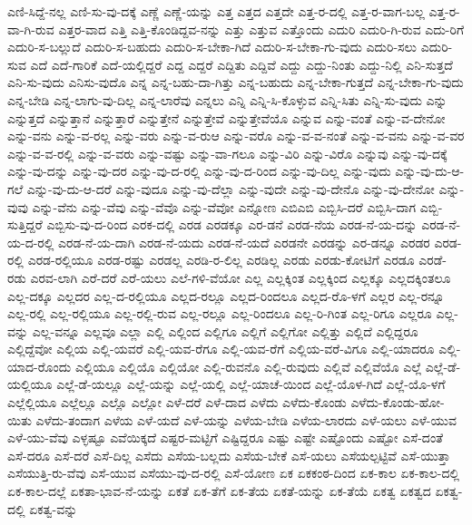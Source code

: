 {ಎಣಿ-ಸಿದ್ದೆ-ನಲ್ಲ
ಎಣಿ-ಸು-ವು-ದಕ್ಕೆ
ಎಣ್ಣೆ
ಎಣ್ಣೆ-ಯನ್ನು
ಎತ್ತ
ಎತ್ತದ
ಎತ್ತದೇ
ಎತ್ತ-ರ-ದಲ್ಲಿ
ಎತ್ತ-ರ-ವಾಗ-ಬಲ್ಲ
ಎತ್ತ-ರ-ವಾ-ಗಿ-ರುವ
ಎತ್ತರ-ವಾದ
ಎತ್ತಿ
ಎತ್ತಿ-ಕೊಂಡಿದ್ದವ-ನನ್ನು
ಎತ್ತು
ಎತ್ತುವ
ಎತ್ತೊಂದು
ಎದುರಿ
ಎದುರಿ-ಗಿ-ರುವ
ಎದು-ರಿಗೆ
ಎದುರಿ-ಸ-ಬಲ್ಲುದೆ
ಎದುರಿ-ಸ-ಬಹುದು
ಎದುರಿ-ಸ-ಬೇಕಾ-ಗಿದೆ
ಎದುರಿ-ಸ-ಬೇಕಾ-ಗು-ವುದು
ಎದುರಿ-ಸಲು
ಎದುರಿ-ಸುವ
ಎದೆ
ಎದೆ-ಗಾರಿಕೆ
ಎದೆ-ಯಲ್ಲಿದ್ದರೆ
ಎದ್ದ
ಎದ್ದರೆ
ಎದ್ದಿತು
ಎದ್ದಿವೆ
ಎದ್ದು
ಎದ್ದು-ನಿಂತು
ಎದ್ದು-ನಿಲ್ಲಿ
ಎನಿ-ಸುತ್ತದೆ
ಎನಿ-ಸು-ವುದು
ಎನಿಸು-ವುದೊ
ಎನ್ನ
ಎನ್ನ-ಬಹು-ದಾ-ಗಿತ್ತು
ಎನ್ನ-ಬಹುದು
ಎನ್ನ-ಬೇಕಾ-ಗುತ್ತದೆ
ಎನ್ನ-ಬೇಕಾ-ಗು-ವುದು
ಎನ್ನ-ಬೇಡಿ
ಎನ್ನ-ಲಾಗು-ವು-ದಿಲ್ಲ
ಎನ್ನ-ಲಾರೆವು
ಎನ್ನಲು
ಎನ್ನಿ
ಎನ್ನಿ-ಸಿ-ಕೊಳ್ಳುವ
ಎನ್ನಿ-ಸಿತು
ಎನ್ನಿ-ಸು-ವುದು
ಎನ್ನು
ಎನ್ನುತ್ತದೆ
ಎನ್ನುತ್ತಾನೆ
ಎನ್ನುತ್ತಾರೆ
ಎನ್ನುತ್ತೇನೆ
ಎನ್ನುತ್ತೇವೆ
ಎನ್ನುತ್ತೇವೆಯೊ
ಎನ್ನುವ
ಎನ್ನು-ವಂತೆ
ಎನ್ನು-ವ-ದೇನೋ
ಎನ್ನು-ವನು
ಎನ್ನು-ವ-ರಲ್ಲ
ಎನ್ನು-ವರು
ಎನ್ನು-ವ-ರುಆ
ಎನ್ನು-ವರೊ
ಎನ್ನು-ವ-ವ-ನಂತೆ
ಎನ್ನು-ವ-ವನು
ಎನ್ನು-ವ-ವರ
ಎನ್ನು-ವ-ವ-ರಲ್ಲಿ
ಎನ್ನು-ವ-ವರು
ಎನ್ನು-ವಷ್ಟು
ಎನ್ನು-ವಾ-ಗಲೂ
ಎನ್ನು-ವಿರಿ
ಎನ್ನು-ವಿರೊ
ಎನ್ನುವು
ಎನ್ನು-ವು-ದಕ್ಕೆ
ಎನ್ನು-ವು-ದನ್ನು
ಎನ್ನು-ವು-ದರ
ಎನ್ನು-ವು-ದ-ರಲ್ಲಿ
ಎನ್ನು-ವು-ದ-ರಿಂದ
ಎನ್ನು-ವು-ದಿಲ್ಲ
ಎನ್ನು-ವುದು
ಎನ್ನು-ವು-ದು-ಆ-ಗಲೆ
ಎನ್ನು-ವು-ದು-ಆ-ದರೆ
ಎನ್ನು-ವುದೂ
ಎನ್ನು-ವು-ದೆಲ್ಲಾ
ಎನ್ನು-ವುದೇ
ಎನ್ನು-ವು-ದೇನೊ
ಎನ್ನು-ವು-ದೇನೋ
ಎನ್ನು-ವುವು
ಎನ್ನು-ವೆನು
ಎನ್ನು-ವೆವು
ಎನ್ನು-ವೆವೊ
ಎನ್ನು-ವೆವೋ
ಎನ್ನೋಣ
ಎಬಿಎಬಿ
ಎಬ್ಬಿಸಿ-ದರೆ
ಎಬ್ಬಿಸಿ-ದಾಗ
ಎಬ್ಬಿ-ಸುತ್ತಿದ್ದರೆ
ಎಬ್ಬಿಸು-ವು-ದ-ರಿಂದ
ಎರಕ-ದಲ್ಲಿ
ಎರಡ
ಎರಡಕ್ಕೂ
ಎರ-ಡನೆ
ಎರಡ-ನೆಯ
ಎರಡ-ನೆ-ಯ-ದನ್ನು
ಎರಡ-ನೆ-ಯ-ದ-ರಲ್ಲಿ
ಎರಡ-ನೆ-ಯ-ದಾಗಿ
ಎರಡ-ನೆ-ಯದು
ಎರಡ-ನೆ-ಯದೆ
ಎರಡನೇ
ಎರಡನ್ನು
ಎರ-ಡನ್ನೂ
ಎರಡರ
ಎರಡ-ರಲ್ಲಿ
ಎರಡ-ರಲ್ಲಿಯೂ
ಎರಡ-ರಷ್ಟು
ಎರಡಲ್ಲ
ಎರಡಿ-ರ-ಲಿಲ್ಲ
ಎರಡಿಲ್ಲ
ಎರಡು
ಎರಡು-ಕೋಟಿಗೆ
ಎರಡೂ
ಎರಡೆ-ರಡು
ಎರವ-ಲಾಗಿ
ಎರೆ-ದರೆ
ಎರೆ-ಯಲು
ಎಲೆ-ಗಳಿ-ವೆಯೋ
ಎಲ್ಲ
ಎಲ್ಲಕ್ಕಿಂತ
ಎಲ್ಲಕ್ಕಿಂದ
ಎಲ್ಲಕ್ಕೂ
ಎಲ್ಲದಕ್ಕಿಂತಲೂ
ಎಲ್ಲ-ದಕ್ಕೂ
ಎಲ್ಲದರ
ಎಲ್ಲ-ದ-ರಲ್ಲಿಯೂ
ಎಲ್ಲದ-ರಲ್ಲೂ
ಎಲ್ಲದ-ರಿಂದಲೂ
ಎಲ್ಲದ-ರೊ-ಳಗೆ
ಎಲ್ಲರ
ಎಲ್ಲ-ರನ್ನೂ
ಎಲ್ಲ-ರಲ್ಲಿ
ಎಲ್ಲ-ರಲ್ಲಿಯೂ
ಎಲ್ಲ-ರಲ್ಲಿ-ರುವ
ಎಲ್ಲ-ರಲ್ಲೂ
ಎಲ್ಲ-ರಿಂದಲೂ
ಎಲ್ಲ-ರಿ-ಗಿಂತ
ಎಲ್ಲ-ರಿಗೂ
ಎಲ್ಲರೂ
ಎಲ್ಲ-ವನ್ನು
ಎಲ್ಲ-ವನ್ನೂ
ಎಲ್ಲವೂ
ಎಲ್ಲಾ
ಎಲ್ಲಿ
ಎಲ್ಲಿಂದ
ಎಲ್ಲಿಗೂ
ಎಲ್ಲಿಗೆ
ಎಲ್ಲಿಗೋ
ಎಲ್ಲಿತ್ತು
ಎಲ್ಲಿದೆ
ಎಲ್ಲಿದ್ದರೂ
ಎಲ್ಲಿದ್ದೆವೋ
ಎಲ್ಲಿಯ
ಎಲ್ಲಿ-ಯವರೆ
ಎಲ್ಲಿ-ಯವ-ರೆಗೂ
ಎಲ್ಲಿ-ಯವ-ರೆಗೆ
ಎಲ್ಲಿಯ-ವರೆ-ವಿಗೂ
ಎಲ್ಲಿ-ಯಾದರೂ
ಎಲ್ಲಿ-ಯಾದ-ರೊಂದು
ಎಲ್ಲಿಯೂ
ಎಲ್ಲಿಯೊ
ಎಲ್ಲಿಯೋ
ಎಲ್ಲಿ-ರುವನೊ
ಎಲ್ಲಿ-ರುವುದು
ಎಲ್ಲಿವೆ
ಎಲ್ಲಿವೆಯೊ
ಎಲ್ಲೆ
ಎಲ್ಲೆ-ಡೆ-ಯಲ್ಲಿಯೂ
ಎಲ್ಲೆ-ಡೆ-ಯಲ್ಲೂ
ಎಲ್ಲೆ-ಯನ್ನು
ಎಲ್ಲೆ-ಯಲ್ಲಿ
ಎಲ್ಲೆ-ಯಾಚೆ-ಯಿಂದ
ಎಲ್ಲೆ-ಯೊಳ-ಗಿದೆ
ಎಲ್ಲೆ-ಯೊ-ಳಗೆ
ಎಲ್ಲೆಲ್ಲಿಯೂ
ಎಲ್ಲೆಲ್ಲೂ
ಎಲ್ಲೊ
ಎಲ್ಲೋ
ಎಳೆ-ದರೆ
ಎಳೆ-ದಾದ
ಎಳೆದು
ಎಳೆದು-ಕೊಂಡು
ಎಳೆದು-ಕೊಂಡು-ಹೋ-ಯಿತು
ಎಳೆದು-ತಂದಾಗ
ಎಳೆಯ
ಎಳೆ-ಯದೆ
ಎಳೆ-ಯನ್ನು
ಎಳೆಯ-ಬೇಡಿ
ಎಳೆಯ-ಲಾರದು
ಎಳೆ-ಯಲು
ಎಳೆ-ಯುವ
ಎಳೆ-ಯು-ವೆವು
ಎಳ್ಳಷ್ಟೂ
ಎವೆಯಿಕ್ಕದೆ
ಎಷ್ಟರ-ಮಟ್ಟಿಗೆ
ಎಷ್ಟಿದ್ದರೂ
ಎಷ್ಟು
ಎಷ್ಟೇ
ಎಷ್ಟೊಂದು
ಎಷ್ಟೋ
ಎಸೆ-ದಂತೆ
ಎಸೆ-ದರೂ
ಎಸೆ-ದರೆ
ಎಸೆ-ದಿಲ್ಲ
ಎಸೆದು
ಎಸೆಯ-ಬಲ್ಲದು
ಎಸೆಯ-ಬೇಕೆ
ಎಸೆ-ಯಲು
ಎಸೆಯಲ್ಪಟ್ಟಿವೆ
ಎಸೆ-ಯುತ್ತಾ
ಎಸೆಯುತ್ತಿ-ರು-ವೆವು
ಎಸೆ-ಯುವ
ಎಸೆಯು-ವು-ದ-ರಲ್ಲಿ
ಎಸೆ-ಯೋಣ
ಏಕ
ಏಕಕಂಠ-ದಿಂದ
ಏಕ-ಕಾಲ
ಏಕ-ಕಾಲ-ದಲ್ಲಿ
ಏಕ-ಕಾಲ-ದಲ್ಲೆ
ಏಕತಾ-ಭಾವ-ನೆ-ಯನ್ನು
ಏಕತೆ
ಏಕ-ತೆಗೆ
ಏಕ-ತೆಯ
ಏಕತೆ-ಯನ್ನು
ಏಕ-ತೆಯೆ
ಏಕತ್ವ
ಏಕತ್ವದ
ಏಕತ್ವ-ದಲ್ಲಿ
ಏಕತ್ವ-ವನ್ನು
}
